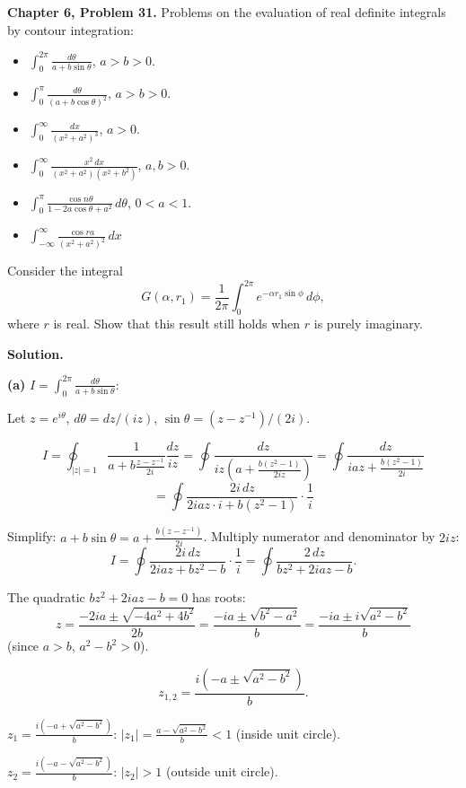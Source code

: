 \documentclass[12pt]{article}
\begin{document}
\textbf{Chapter 6, Problem 31.} Problems on the evaluation of real definite integrals by contour integration:
\begin{itemize}
\item[(a)] $\displaystyle\int_0^{2\pi}\frac{d\theta}{a+b\sin\theta}$, \quad $a > b > 0$.
\item[(b)] $\displaystyle\int_0^{\pi}\frac{d\theta}{(a+b\cos\theta)^2}$, \quad $a > b > 0$.
\item[(c)] $\displaystyle\int_0^{\infty}\frac{dx}{(x^2+a^2)^3}$, \quad $a > 0$.
\item[(d)] $\displaystyle\int_0^{\infty}\frac{x^2\,dx}{(x^2+a^2)(x^2+b^2)}$, \quad $a, b > 0$.
\item[(e)] $\displaystyle\int_0^{\pi}\frac{\cos n\theta}{1-2a\cos\theta+a^2}\,d\theta$, \quad $0 < a < 1$.
\item[(f)] $\displaystyle\int_{-\infty}^{\infty}\frac{\cos ra}{(x^2+a^2)^2}\,dx$
\end{itemize}

Consider the integral
\[
G(\alpha, r_1) = \frac{1}{2\pi}\int_0^{2\pi}e^{-\alpha r_1\sin\phi}\,d\phi,
\]
where $r$ is real. Show that this result still holds when $r$ is purely imaginary.

\bigskip
\textbf{Solution.}

\textbf{(a)} $\displaystyle I = \int_0^{2\pi}\frac{d\theta}{a+b\sin\theta}$:

Let $z = e^{i\theta}$, $d\theta = dz/(iz)$, $\sin\theta = (z-z^{-1})/(2i)$.

\[
I = \oint_{|z|=1}\frac{1}{a+b\frac{z-z^{-1}}{2i}}\frac{dz}{iz} = \oint\frac{dz}{iz\left(a+\frac{b(z^2-1)}{2iz}\right)} = \oint\frac{dz}{iaz + \frac{b(z^2-1)}{2i}}
\]
\[
= \oint\frac{2i\,dz}{2iaz\cdot i + b(z^2-1)} \cdot \frac{1}{i}
\]

Simplify: $a + b\sin\theta = a + \frac{b(z-z^{-1})}{2i}$. Multiply numerator and denominator by $2iz$:
\[
I = \oint\frac{2i\,dz}{2iaz + bz^2 - b} \cdot \frac{1}{i} = \oint\frac{2\,dz}{bz^2+2iaz-b}.
\]

The quadratic $bz^2+2iaz-b = 0$ has roots:
\[
z = \frac{-2ia \pm \sqrt{-4a^2+4b^2}}{2b} = \frac{-ia \pm \sqrt{b^2-a^2}}{b} = \frac{-ia \pm i\sqrt{a^2-b^2}}{b}
\]
(since $a > b$, $a^2-b^2 > 0$).

\[
z_{1,2} = \frac{i(-a\pm\sqrt{a^2-b^2})}{b}.
\]

$z_1 = \frac{i(-a+\sqrt{a^2-b^2})}{b}$: $|z_1| = \frac{a-\sqrt{a^2-b^2}}{b} < 1$ (inside unit circle).

$z_2 = \frac{i(-a-\sqrt{a^2-b^2})}{b}$: $|z_2| > 1$ (outside unit circle).
\end{document}
